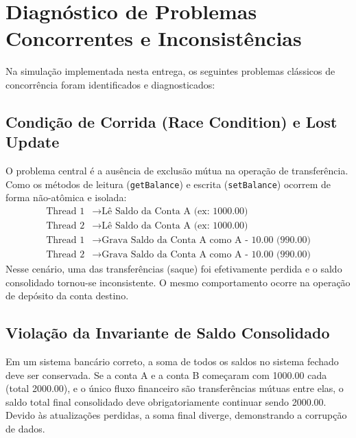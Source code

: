 \documentclass[12pt,a4paper]{article}
\begin{document}
\section{Diagnóstico de Problemas Concorrentes e Inconsistências}

\noindent Na simulação implementada nesta entrega, os seguintes problemas clássicos de concorrência foram identificados e diagnosticados:

\subsection{Condição de Corrida (Race Condition) e Lost Update}
O problema central é a ausência de exclusão mútua na operação de transferência. Como os métodos de leitura (\texttt{getBalance}) e escrita (\texttt{setBalance}) ocorrem de forma não-atômica e isolada:
\begin{align*}
    \text{Thread 1} &\longrightarrow \text{Lê Saldo da Conta A (ex: 1000.00)} \\
    \text{Thread 2} &\longrightarrow \text{Lê Saldo da Conta A (ex: 1000.00)} \\
    \text{Thread 1} &\longrightarrow \text{Grava Saldo da Conta A como A - 10.00 (990.00)} \\
    \text{Thread 2} &\longrightarrow \text{Grava Saldo da Conta A como A - 10.00 (990.00)}
\end{align*}
Nesse cenário, uma das transferências (saque) foi efetivamente perdida e o saldo consolidado tornou-se inconsistente. O mesmo comportamento ocorre na operação de depósito da conta destino.

\subsection{Violação da Invariante de Saldo Consolidado}
Em um sistema bancário correto, a soma de todos os saldos no sistema fechado deve ser conservada. Se a conta A e a conta B começaram com 1000.00 cada (total 2000.00), e o único fluxo financeiro são transferências mútuas entre elas, o saldo total final consolidado deve obrigatoriamente continuar sendo 2000.00. Devido às atualizações perdidas, a soma final diverge, demonstrando a corrupção de dados.
\end{document}
